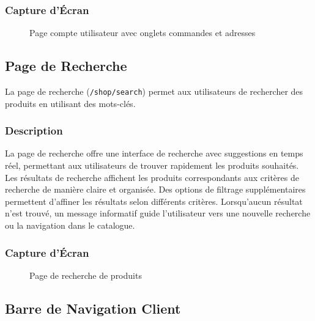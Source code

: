 \documentclass[12pt,a4paper]{article}
\begin{document}
\subsubsection{Capture d'Écran}

\begin{figure}[H]
    \centering
    \caption{Page compte utilisateur avec onglets commandes et adresses}
    \label{fig:account}
\end{figure}

\subsection{Page de Recherche}

La page de recherche (\texttt{/shop/search}) permet aux utilisateurs de rechercher des produits en utilisant des mots-clés.

\subsubsection{Description}

La page de recherche offre une interface de recherche avec suggestions en temps réel, permettant aux utilisateurs de trouver rapidement les produits souhaités. Les résultats de recherche affichent les produits correspondants aux critères de recherche de manière claire et organisée. Des options de filtrage supplémentaires permettent d'affiner les résultats selon différents critères. Lorsqu'aucun résultat n'est trouvé, un message informatif guide l'utilisateur vers une nouvelle recherche ou la navigation dans le catalogue.

\subsubsection{Capture d'Écran}

\begin{figure}[H]
    \centering
    \caption{Page de recherche de produits}
    \label{fig:search}
\end{figure}

\subsection{Barre de Navigation Client}
\end{document}
